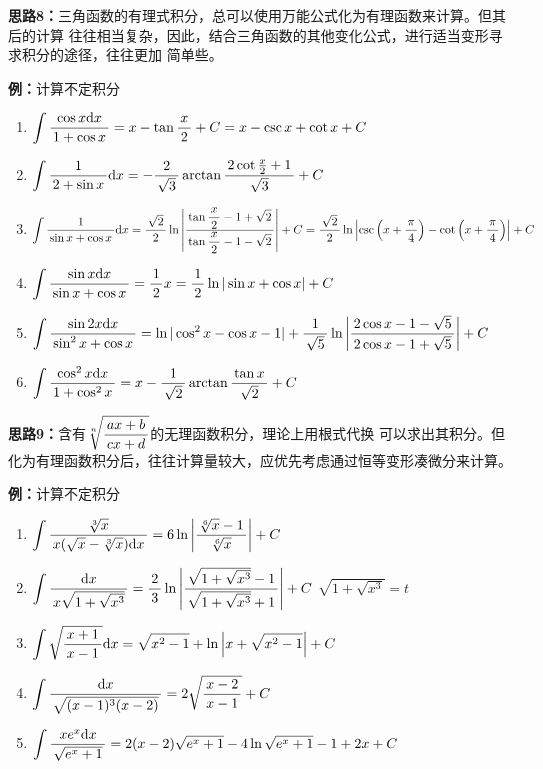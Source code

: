 \begin{shaded}
{\bf 思路8：}三角函数的有理式积分，总可以使用万能公式化为有理函数来计算。但其后的计算
往往相当复杂，因此，结合三角函数的其他变化公式，进行适当变形寻求积分的途径，往往更加
简单些。
\end{shaded}

{\bf 例：}计算不定积分
\begin{enumerate}[(1)]
  \setlength{\itemindent}{1cm}
  \item $\dint\df{\cos x\d x}{1+\cos x}=x-\tan\df x2+C=x-\csc x+\cot x+C$
  \item $\dint\df1{2+\sin x}\d x=-\df2{\sqrt3}\arctan\df{2\cot\frac 
  x2+1}{\sqrt 3}+C$
  \item $\dint\df1{\sin x+\cos x}\d x=\df{\sqrt 2}{2}\ln\left|
  \df{\tan\df x2-1+\sqrt 2}{\tan\df x2-1-\sqrt 2}\right|+C
  =\df{\sqrt2}2\ln\left|\csc\left(x+\df{\pi}4\right)
  -\cot\left(x+\df{\pi}4\right)\right|+C$
  \item $\dint\df{\sin x\d x}{\sin x+\cos x}=\df12x=\df12
  \ln|\sin x+\cos x|+C$
  \item $\dint\df{\sin2x\d x}{\sin^2x+\cos x}=
  \ln|\cos^2x-\cos x-1|+\df1{\sqrt5}\ln\left|
  \df{2\cos x-1-\sqrt5}{2\cos x-1+\sqrt 5}\right|+C$
  \item $\dint\df{\cos^2x\d x}{1+\cos^2x}=x-\df1{\sqrt2}\arctan
  \df{\tan x}{\sqrt 2}+C$
\end{enumerate}

\begin{shaded}
{\bf 思路9：}含有$\ds\sqrt[n]{\df{ax+b}{cx+d}}$的无理函数积分，理论上用根式代换
可以求出其积分。但化为有理函数积分后，往往计算量较大，应优先考虑通过恒等变形凑微分来计算。
\end{shaded}

{\bf 例：}计算不定积分
\begin{enumerate}[(1)]
  \setlength{\itemindent}{1cm}
  \item $\dint\df{\sqrt[3]x}{x(\sqrt x-\sqrt[3]x)\d x}=6\ln\left|
  \df{\sqrt[6]x-1}{\sqrt[6]x}\right|+C$
  \item $\dint\df{\d x}{x\sqrt{1+\sqrt{x^3}}}=\df23\ln\left|
  \df{\sqrt{1+\sqrt{x^3}}-1}{\sqrt{1+\sqrt{x^3}}+1}\right|+C$
  \hfill$\sqrt{1+\sqrt{x^3}}=t$
  \item $\dint\sqrt{\df{x+1}{x-1}}\d x=\sqrt{x^2-1}+\ln\left|
  x+\sqrt{x^2-1}\right|+C$
  \item $\dint\df{\d x}{\sqrt{(x-1)^3(x-2)}}=2\sqrt{\df{x-2}{x-1}}+C$
  \item $\dint\df{xe^x\d x}{\sqrt{e^x+1}}=2(x-2)\sqrt{e^x+1}
  -4\ln{\sqrt{e^x+1}-1}+2x+C$
\end{enumerate}

